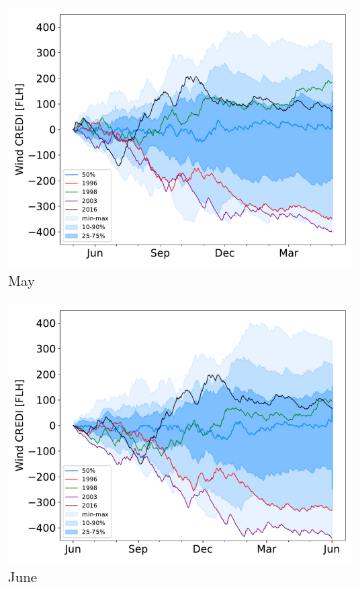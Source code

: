 \documentclass[12pt]{iopart}
\begin{document}
\begin{figure}[b]
\begin{subfigure}[t]{0.32\linewidth}
    \includegraphics[width=\linewidth]{Figures_SI/Fig_CUMSUM_YearStart_May}
    \caption{May }
\end{subfigure}
\begin{subfigure}[t]{0.32\linewidth}
    \includegraphics[width=\linewidth]{Figures_SI/Fig_CUMSUM_YearStart_June}
    \caption{June }
\end{subfigure}
\begin{subfigure}[t]{0.32\linewidth}

\end{subfigure}
\end{figure}
\end{document}
